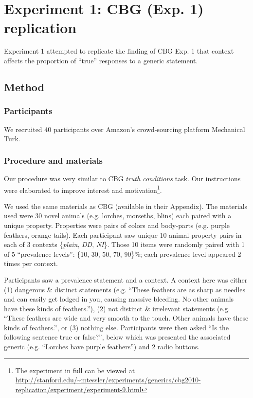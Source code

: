 \documentclass[10pt,letterpaper]{article}
\begin{document}
\section{Experiment 1: CBG (Exp. 1) replication}

Experiment 1 attempted to replicate the finding of CBG Exp. 1 that context affects the proportion of ``true'' responses to a generic statement. 

\subsection{Method}

\subsubsection{Participants}

We recruited 40 participants over Amazon's crowd-sourcing platform Mechanical Turk. 

\subsubsection{Procedure and materials}

Our procedure was very similar to CBG \emph{truth conditions} task. Our instructions were elaborated to improve interest and motivation\footnote{The experiment in full can be viewed at \url{http://stanford.edu/~mtessler/experiments/generics/cbg2010-replication/experiment/experiment-9.html}}. 

We used the same materials as CBG (available in their Appendix). The materials used were 30 novel animals (e.g. lorches, morseths, blins) each paired with a unique property. Properties were pairs of colors and body-parts (e.g. purple feathers, orange tails). Each participant saw unique 10 animal-property pairs in each of 3 contexts \{\emph{plain}, \emph{DD}, \emph{NI}\}. Those 10 items were randomly paired with 1 of 5 ``prevalence levels'': \{10, 30, 50, 70, 90\}\%; each prevalence level appeared 2 times per context. 

Participants saw a prevalence statement and a context. A context here was either (1) dangerous \& distinct statements (e.g. ``These feathers are as sharp as needles and can easily get lodged in you, causing massive bleeding. No other animals have these kinds of feathers.''), (2) not distinct \& irrelevant statements (e.g. ``These feathers are wide and very smooth to the touch. Other animals have these kinds of feathers.'', or (3) nothing else. Participants were then asked ``Is the following sentence true or false?'', below which was presented the associated generic (e.g. ``Lorches have purple feathers'') and 2 radio buttons. 
\end{document}
